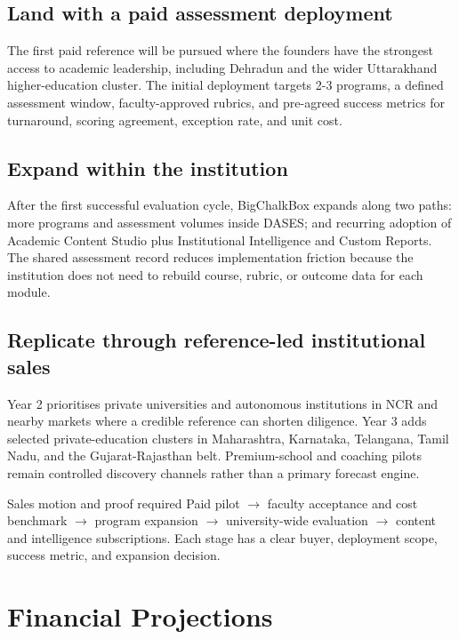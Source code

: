 \documentclass[11pt,a4paper]{article}
\begin{document}
\subsection{Land with a paid assessment deployment}

The first paid reference will be pursued where the founders have the strongest access to academic leadership, including Dehradun and the wider Uttarakhand higher-education cluster. The initial deployment targets 2-3 programs, a defined assessment window, faculty-approved rubrics, and pre-agreed success metrics for turnaround, scoring agreement, exception rate, and unit cost.

\subsection{Expand within the institution}

After the first successful evaluation cycle, BigChalkBox expands along two paths: more programs and assessment volumes inside DASES; and recurring adoption of Academic Content Studio plus Institutional Intelligence and Custom Reports. The shared assessment record reduces implementation friction because the institution does not need to rebuild course, rubric, or outcome data for each module.

\subsection{Replicate through reference-led institutional sales}

Year 2 prioritises private universities and autonomous institutions in NCR and nearby markets where a credible reference can shorten diligence. Year 3 adds selected private-education clusters in Maharashtra, Karnataka, Telangana, Tamil Nadu, and the Gujarat-Rajasthan belt. Premium-school and coaching pilots remain controlled discovery channels rather than a primary forecast engine.

\begin{bluebox}{Sales motion and proof required}
Paid pilot \(\rightarrow\) faculty acceptance and cost benchmark \(\rightarrow\) program expansion \(\rightarrow\) university-wide evaluation \(\rightarrow\) content and intelligence subscriptions. Each stage has a clear buyer, deployment scope, success metric, and expansion decision.
\end{bluebox}

\section{Financial Projections}
\end{document}
